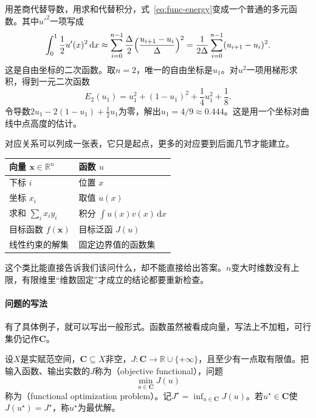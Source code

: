 用差商代替导数，用求和代替积分，式~\eqref{eq:func-energy}变成一个普通的多元函数。其中$u'^2$一项写成
\[
 \int_0^1\frac12u'(x)^2\,\mathrm{d}x\approx\sum_{i=0}^{n-1}\frac{\Delta}{2}\Bigl(\frac{u_{i+1}-u_i}{\Delta}\Bigr)^2
 =\frac{1}{2\Delta}\sum_{i=0}^{n-1}(u_{i+1}-u_i)^2.
\]
这是自由坐标的二次函数。取$n=2$，唯一的自由坐标是$u_1$。对$u^2$一项用梯形求积，得到一元二次函数
\[
 E_2(u_1)=u_1^2+(1-u_1)^2+\frac14u_1^2+\frac18.
\]
令导数$2u_1-2(1-u_1)+\frac12u_1$为零，解出$u_1=4/9\approx0.444$。这是用一个坐标对曲线中点高度的估计。

对应关系可以列成一张表，它只是起点，更多的对应要到后面几节才能建立。

\begin{BookInlineTable}
  \centering
  \caption{向量与函数的对应关系。}
  \label{tab:func-analogy}
  \begin{tabular}{ll}
    \toprule
    向量 $\bm{x}\in\mathbb{R}^n$ & 函数 $u$\\
    \midrule
    下标 $i$ & 位置 $x$\\
    坐标 $x_i$ & 取值 $u(x)$\\
    求和 $\sum_ix_iy_i$ & 积分 $\int u(x)v(x)\,\mathrm{d}x$\\
    目标函数 $f(\bm{x})$ & 目标泛函 $J(u)$\\
    线性约束的解集 & 固定边界值的函数集\\
    \bottomrule
  \end{tabular}
\end{BookInlineTable}

这个类比能直接告诉我们该问什么，却不能直接给出答案。$n$变大时维数没有上限，有限维里“维数固定”才成立的结论都要重新检查。

\paragraph{问题的写法}
有了具体例子，就可以写出一般形式。函数虽然被看成向量，写法上不加粗，可行集仍记作$\bm{C}$。

\begin{definition}[泛函优化问题]
\label{def:func-problem}
设$X$是实赋范空间，$\bm{C}\subseteq X$非空，$J:\bm{C}\to\mathbb{R}\cup\{+\infty\}$，且至少有一点取有限值。把输入函数、输出实数的$J$称为（objective functional），问题
\begin{equation}
 \min_{u\in\bm{C}}J(u)
 \label{eq:func-problem}
\end{equation}
称为（functional optimization problem）。记$J^\star=\inf_{u\in\bm{C}}J(u)$。若$u^\star\in\bm{C}$使$J(u^\star)=J^\star$，称$u^\star$为最优解。
\end{definition}

